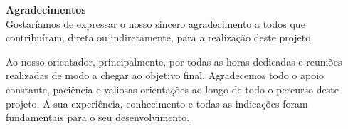 
\vspace*{\fill} 

\begin{center}
    {\Huge \bfseries Agradecimentos} \\[1cm] 
    
    Gostaríamos de expressar o nosso sincero agradecimento a todos que contribuíram, direta ou indiretamente, para a realização deste projeto. 
    
    Ao nosso orientador, principalmente, por todas as horas dedicadas e reuniões realizadas de modo a chegar ao objetivo final. Agradecemos todo o apoio constante, paciência e valiosas orientações ao longo de todo o percurso deste projeto. A sua experiência, conhecimento e todas as indicações foram fundamentais para o seu desenvolvimento.
\end{center}

\vspace*{\fill} 

\newpage